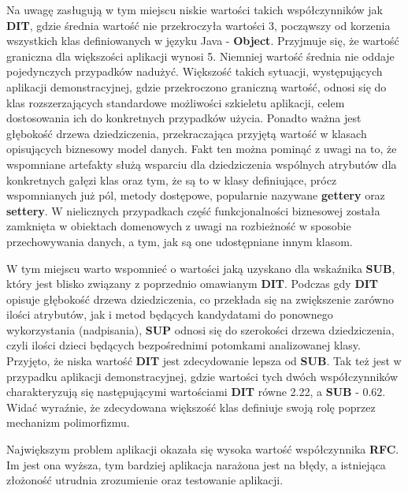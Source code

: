 Na uwagę zasługują w tym miejscu niskie wartości takich współczynników jak \textbf{DIT}, gdzie średnia wartość nie przekroczyła wartości 3, począwszy od korzenia wszystkich klas definiowanych w języku Java - \textbf{Object}. Przyjmuje się, że wartość graniczna dla większości aplikacji wynosi 5. Niemniej wartość średnia nie oddaje pojedynczych przypadków nadużyć. Większość takich sytuacji, występujących aplikacji demonstracyjnej, gdzie przekroczono graniczną wartość, odnosi się do klas rozszerzających standardowe możliwości szkieletu aplikacji, celem dostosowania ich do konkretnych przypadków użycia. Ponadto ważna jest głębokość drzewa dziedziczenia, przekraczająca przyjętą wartość w klasach opisujących biznesowy model danych. Fakt ten można pominąć z uwagi na to, że wspomniane artefakty służą wsparciu dla dziedziczenia wspólnych atrybutów dla konkretnych gałęzi klas oraz tym, że są to w klasy definiujące, prócz wspomnianych już pól, metody dostępowe, popularnie nazywane \textbf{gettery} oraz \textbf{settery}. W nielicznych przypadkach część funkcjonalności biznesowej została zamknięta w obiektach domenowych z uwagi na rozbieżność w sposobie przechowywania danych, a tym, jak są one udostępniane innym klasom. 

W tym miejscu warto wspomnieć o wartości jaką uzyskano dla wskaźnika \textbf{SUB}, który jest blisko związany z poprzednio omawianym \textbf{DIT}. Podczas gdy \textbf{DIT} opisuje głębokość drzewa dziedziczenia, co przekłada się na zwiększenie zarówno ilości atrybutów, jak i metod będących kandydatami do ponownego wykorzystania (nadpisania), \textbf{SUP} odnosi się do szerokości drzewa dziedziczenia, czyli ilości dzieci będących bezpośrednimi potomkami analizowanej klasy. Przyjęto, że niska wartość \textbf{DIT} jest zdecydowanie lepsza od \textbf{SUB}. Tak też jest w przypadku aplikacji demonstracyjnej, gdzie wartości tych dwóch współczynników charakteryzują się następującymi wartościami \textbf{DIT} równe 2.22, a \textbf{SUB} - 0.62. Widać wyraźnie, że zdecydowana większość klas definiuje swoją rolę poprzez mechanizm polimorfizmu.

Największym problem aplikacji okazała się wysoka wartość współczynnika \textbf{RFC}. Im jest ona wyższa, tym bardziej aplikacja narażona jest na błędy, a istniejąca złożoność utrudnia zrozumienie oraz testowanie aplikacji. 


